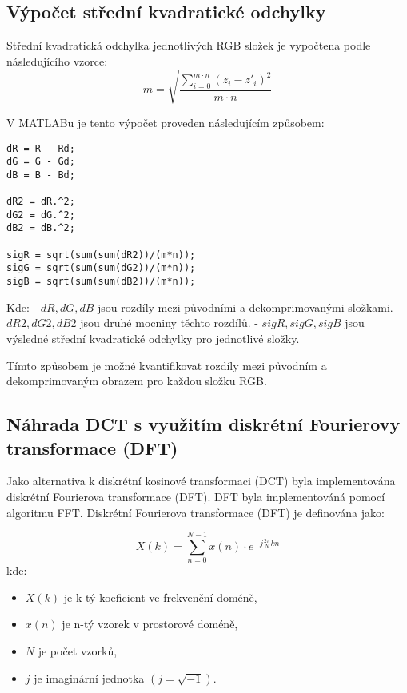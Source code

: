 \subsection{Výpočet střední kvadratické odchylky}
Střední kvadratická odchylka jednotlivých RGB složek je vypočtena podle následujícího vzorce:
\[
m = \sqrt{\frac{\sum_{i=0}^{m \cdot n} (z_i - z'_i)^2}{m \cdot n}}
\]

V MATLABu je tento výpočet proveden následujícím způsobem:
\begin{verbatim}
dR = R - Rd;
dG = G - Gd;
dB = B - Bd;

dR2 = dR.^2;
dG2 = dG.^2;
dB2 = dB.^2;

sigR = sqrt(sum(sum(dR2))/(m*n));
sigG = sqrt(sum(sum(dG2))/(m*n));
sigB = sqrt(sum(sum(dB2))/(m*n));
\end{verbatim}

Kde:
- \( dR, dG, dB \) jsou rozdíly mezi původními a dekomprimovanými složkami.
- \( dR2, dG2, dB2 \) jsou druhé mocniny těchto rozdílů.
- \( sigR, sigG, sigB \) jsou výsledné střední kvadratické odchylky pro jednotlivé složky.

Tímto způsobem je možné kvantifikovat rozdíly mezi původním a dekomprimovaným obrazem pro každou složku RGB.

\subsection{Náhrada DCT s využitím diskrétní Fourierovy transformace (DFT)}

Jako alternativa k diskrétní kosinové transformaci (DCT) byla implementována diskrétní Fourierova transformace (DFT). DFT byla implementováná pomocí algoritmu FFT.\cite{FFTWiki} Diskrétní Fourierova transformace (DFT) je definována jako:

\[
X(k) = \sum_{n=0}^{N-1} x(n) \cdot e^{-j \frac{2\pi}{N} kn}
\]
kde:
\begin{itemize}
    \item \( X(k) \) je k-tý koeficient ve frekvenční doméně,
    \item \( x(n) \) je n-tý vzorek v prostorové doméně,
    \item \( N \) je počet vzorků,
    \item \( j \) je imaginární jednotka \((j = \sqrt{-1})\).
\end{itemize}

